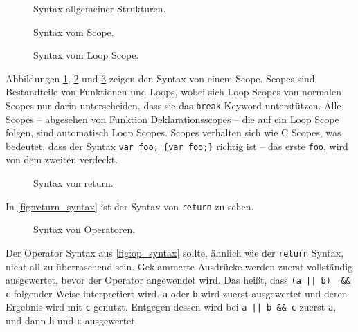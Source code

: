     \begin{figure}[H]
      \centering
      \caption{Syntax allgemeiner Strukturen.}
      \label{fig:common_syntax}
    \end{figure}

    \begin{figure}[H]
      \centering
      \caption{Syntax vom Scope.}
      \label{fig:scope_syntax}
    \end{figure}

    \begin{figure}[H]
      \centering
      \caption{Syntax vom Loop Scope.}
      \label{fig:loop_scope_syntax}
    \end{figure}
    Abbildungen \ref{fig:common_syntax}, \ref{fig:scope_syntax} und \ref{fig:loop_scope_syntax} zeigen den Syntax von einem Scope. Scopes sind Bestandteile von Funktionen und Loops, wobei sich Loop Scopes von normalen Scopes nur darin unterscheiden, dass sie das \lstinline[style=MyMacroStyle]$break$ Keyword unterstützen. Alle Scopes -- abgesehen von Funktion Deklarationsscopes -- die auf ein Loop Scope folgen, sind automatisch Loop Scopes. Scopes verhalten sich wie C Scopes, was bedeutet, dass der Syntax \lstinline[style=MyMacroStyle]$var foo; {var foo;}$ richtig ist -- das erste \lstinline[style=MyMacroStyle]$foo$, wird von dem zweiten verdeckt.

    \begin{figure}[H]
      \centering
      \caption{Syntax von return.}
      \label{fig:return_syntax}
    \end{figure}
    In \autoref{fig:return_syntax} ist der Syntax von \lstinline[style=MyMacroStyle]$return$ zu sehen.

    \begin{figure}[H]
      \centering
      \caption{Syntax von Operatoren.}
      \label{fig:op_syntax}
    \end{figure}
    Der Operator Syntax aus \autoref{fig:op_syntax} sollte, ähnlich wie der \lstinline[style=MyMacroStyle]$return$ Syntax, nicht all zu überraschend sein. Geklammerte Ausdrücke werden zuerst vollständig ausgewertet, bevor der Operator angewendet wird. Das heißt, dass \lstinline[style=MyMacroStyle]$(a || b)  && c$ folgender Weise interpretiert wird. \lstinline[style=MyMacroStyle]$a$ oder \lstinline[style=MyMacroStyle]$b$ wird zuerst ausgewertet und deren Ergebnis wird mit \lstinline[style=MyMacroStyle]$c$ genutzt. Entgegen dessen wird bei \lstinline[style=MyMacroStyle]$a || b && c$ zuerst \lstinline[style=MyMacroStyle]$a$, und dann \lstinline[style=MyMacroStyle]$b$ und \lstinline[style=MyMacroStyle]$c$ ausgewertet.

